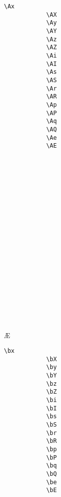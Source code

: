 \documentclass[10pt, a4paper]{article}
\begin{document}
\begin{enumerate}
		\begin{center}
			\begin{minipage}[h][8cm][t]{15em}
				\begin{lstlisting}[style=B]
			\Ax
			\AX
			\Ay
			\AY
			\Az
			\AZ
			\Ai
			\AI
			\As
			\AS
			\Ar
			\AR
			\Ap
			\AP
			\Aq
			\AQ
			\Ae
			\AE
				\end{lstlisting}
			\end{minipage}
			\begin{minipage}[h][8cm][t]{15em}
				\begin{fgls}
					\ \\
					\Ax\\
					\AX\\
					\Ay\\
					\AY\\
					\Az\\
					\AZ\\
					\Ai\\
					\AI\\
					\As\\
					\AS\\
					\Ar\\
					\AR\\
					\Ap\\
					\AP\\
					\Aq\\
					\AQ\\
					\Ae\\
					\AE
				\end{fgls}
			\end{minipage}
		\end{center}
		\begin{center}
			\begin{minipage}[h][8cm][t]{15em}
				\begin{lstlisting}[style=B]
			\bx
			\bX
			\by
			\bY
			\bz
			\bZ
			\bi
			\bI
			\bs
			\bS
			\br
			\bR
			\bp
			\bP
			\bq
			\bQ
			\be
			\bE
				\end{lstlisting}
			\end{minipage}
			\begin{minipage}[h][8cm][t]{15em}
				\begin{fgls}
					\ \\
					\bx\\
					\bX\\
					\by\\
					\bY\\
					\bz\\
					\bZ\\

\end{fgls}
\end{minipage}
\end{center}
\end{enumerate}
\end{document}
